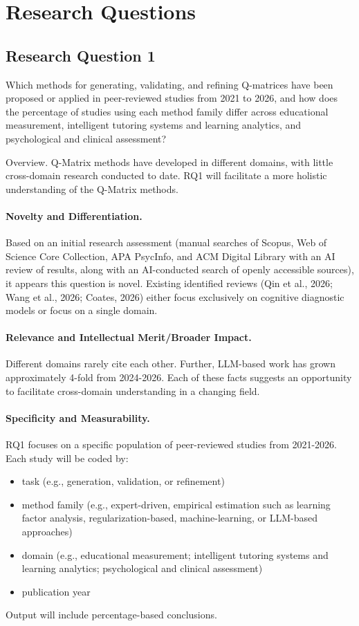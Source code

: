 \documentclass[sigconf,nonacm]{acmart}
\begin{document}
\section{Research Questions}

\subsection{Research Question 1}

Which methods for generating, validating, and refining Q-matrices have been proposed or applied in peer-reviewed studies from 2021 to 2026, and how does the percentage of studies using each method family differ across educational measurement, intelligent tutoring systems and learning analytics, and psychological and clinical assessment?

Overview. Q-Matrix methods have developed in different domains, with little cross-domain research conducted to date. RQ1 will facilitate a more holistic understanding of the Q-Matrix methods.

\paragraph{Novelty and Differentiation.} Based on an initial research assessment (manual searches of Scopus, Web of Science Core Collection, APA PsycInfo, and ACM Digital Library with an AI review of results, along with an AI-conducted search of openly accessible sources), it appears this question is novel. Existing identified reviews (Qin et al., 2026; Wang et al., 2026; Coates, 2026) either focus exclusively on cognitive diagnostic models or focus on a single domain.

\paragraph{Relevance and Intellectual Merit/Broader Impact.} Different domains rarely cite each other. Further, LLM-based work has grown approximately 4-fold from 2024-2026. Each of these facts suggests an opportunity to facilitate cross-domain understanding in a changing field.

\paragraph{Specificity and Measurability.} RQ1 focuses on a specific population of peer-reviewed studies from 2021-2026. Each study will be coded by:

\begin{itemize}
    \item task (e.g., generation, validation, or refinement)
    \item method family (e.g., expert-driven, empirical estimation such as learning factor analysis, regularization-based, machine-learning, or LLM-based approaches)
    \item domain (e.g., educational measurement; intelligent tutoring systems and learning analytics; psychological and clinical assessment)
    \item publication year
\end{itemize}
Output will include percentage-based conclusions.
\end{document}

